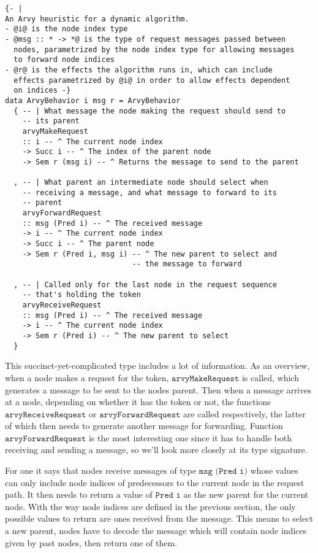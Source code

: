 \documentclass[a4paper, oneside]{discothesis}
\begin{document}
\begin{verbatim}
{- |
An Arvy heuristic for a dynamic algorithm.
- @i@ is the node index type
- @msg :: * -> *@ is the type of request messages passed between
  nodes, parametrized by the node index type for allowing messages
  to forward node indices
- @r@ is the effects the algorithm runs in, which can include
  effects parametrized by @i@ in order to allow effects dependent
  on indices -}
data ArvyBehavior i msg r = ArvyBehavior
  { -- | What message the node making the request should send to
    -- its parent
    arvyMakeRequest
    :: i -- ^ The current node index
    -> Succ i -- ^ The index of the parent node
    -> Sem r (msg i) -- ^ Returns the message to send to the parent

  , -- | What parent an intermediate node should select when
    -- receiving a message, and what message to forward to its
    -- parent
    arvyForwardRequest
    :: msg (Pred i) -- ^ The received message
    -> i -- ^ The current node index
    -> Succ i -- ^ The parent node
    -> Sem r (Pred i, msg i) -- ^ The new parent to select and
                             -- the message to forward

  , -- | Called only for the last node in the request sequence
    -- that's holding the token
    arvyReceiveRequest
    :: msg (Pred i) -- ^ The received message
    -> i -- ^ The current node index
    -> Sem r (Pred i) -- ^ The new parent to select
  }
\end{verbatim}

This succinct-yet-complicated type includes a lot of information. As an overview, when a node makes a request for the token, $\texttt{arvyMakeRequest}$ is called, which generates a message to be sent to the nodes parent. Then when a message arrives at a node, depending on whether it has the token or not, the functions $\texttt{arvyReceiveRequest}$ or $\texttt{arvyForwardRequest}$ are called respectively, the latter of which then needs to generate another message for forwarding. Function $\texttt{arvyForwardRequest}$ is the most interesting one since it has to handle both receiving and sending a message, so we'll look more closely at its type signature.

For one it says that nodes receive messages of type $\texttt{msg (Pred i)}$ whose values can only include node indices of predecessors to the current node in the request path. It then needs to return a value of $\texttt{Pred i}$ as the new parent for the current node. With the way node indices are defined in the previous section, the only possible values to return are ones received from the message. This means to select a new parent, nodes have to decode the message which will contain node indices given by past nodes, then return one of them.
\end{document}
